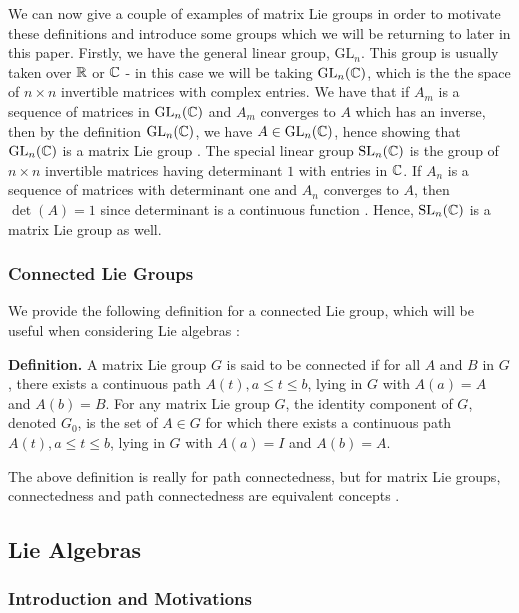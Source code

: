 \documentclass[11pt, a4paper, oneside]{article}
\theoremstyle{plain}
\theoremstyle{definition}
\theoremstyle{example}
\def\GL{\mathrm{GL}} \def\SL{\mathrm{SL}} \def\sl{\mathrm{sl}} \def\gl{\mathrm{gl}} \def\SO{\mathrm{SO}} \def\SU{\mathrm{SU}}  \def\SP{\mathrm{SP}} \def\g{\mathfrak{g}} \def\h{\mathfrak{h}} \def\Sym{\mathrm{Sym}}
\begin{document}
\par
We can now give a couple of examples of matrix Lie groups in order to motivate these definitions and introduce some groups which we will be returning to later in this paper. Firstly, we have the general linear group, $\GL_n$. This group is usually taken over $\mathbb{R}$ or $\mathbb{C}$ - in  this case we will be taking $\GL_n(\CC)$, which is the the space of $n \times n$ invertible matrices with complex entries. We have that if $A_m$ is a sequence of matrices in $\GL_n(\CC)$ and $A_m$ converges to $A$ which has an inverse, then by the definition $\GL_n(\CC)$, we have $A \in \GL_n(\CC)$, hence showing that $\GL_n(\CC)$ is a matrix Lie group \cite[\S 1.2.1]{hall}. The special linear group $\SL_n(\CC)$ is the group of $n \times n$ invertible matrices having determinant $1$ with entries in $\mathbb{C}$. If $A_n$ is a sequence of matrices with determinant one and $A_n$ converges to $A$, then $\det(A) = 1$ since determinant is a continuous function \cite[\S 1.2.1]{hall}. Hence, $\SL_n(\CC)$ is a matrix Lie group as well. 

\subsubsection{Connected Lie Groups}

We provide the following definition for a connected Lie group, which will be useful when considering Lie algebras \cite[\S 1.3.2, Definition 1.9]{hall}:

\par
\textbf{Definition.} A matrix Lie group $G$ is said to be connected if for all $A$ and $B$ in $G$, there exists a continuous path $A(t), a \leq t \leq b$, lying in $G$ with $A(a) = A$ and $A(b) = B$. For any matrix Lie group $G$, the identity component of $G$, denoted $G_0$, is the set of $A \in G$ for which there exists a continuous path $A(t), a \leq t \leq b$, lying in $G$ with $A(a) = I$ and $A(b) = A$.

\par
The above definition is really for path connectedness, but for matrix Lie groups, connectedness and path connectedness are equivalent concepts \cite[\S 1.3.2]{hall}.

\subsection{Lie Algebras}

\subsubsection{Introduction and Motivations}
\end{document}
